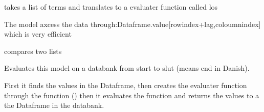\documentclass[letterpaper,10pt,english]{sphinxmanual}
\begin{document}
\begin{fulllineitems}
\begin{fulllineitems}
\end{fulllineitems}


\begin{fulllineitems}
\label{\detokenize{core/modelclass:modelclass.BaseModel.outeval}}
\pysigstartsignatures
{}
\pysigstopsignatures
\sphinxAtStartPar
takes a list of terms and translates to a evaluater function called los

\sphinxAtStartPar
The model axcess the data through:Dataframe.value{[}rowindex+lag,coloumnindex{]} which is very efficient

\end{fulllineitems}


\begin{fulllineitems}
\label{\detokenize{core/modelclass:modelclass.BaseModel.eqcolumns}}
\pysigstartsignatures
{}
\pysigstopsignatures
\sphinxAtStartPar
compares two lists

\end{fulllineitems}


\begin{fulllineitems}
\label{\detokenize{core/modelclass:modelclass.BaseModel.xgenr}}
\pysigstartsignatures
{}
\pysigstopsignatures
\sphinxAtStartPar
Evaluates this model on a databank from start to slut (means end in Danish).

\sphinxAtStartPar
First it finds the values in the Dataframe, then creates the evaluater function through the  function
()
then it evaluates the function and returns the values to a the Dataframe in the databank.


\end{fulllineitems}
\end{fulllineitems}
\end{document}
